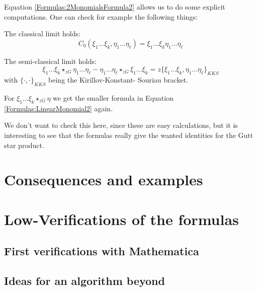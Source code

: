 \begin{remark}
	Equation \eqref{Formulas:2MonomialsFormula2} allows us to do some 
	explicit computations. One can check for example the following 
	things:
	\begin{remarklist}
		\item
		The classical limit holds:
		\begin{equation*}
			C_0(\xi_1 \ldots \xi_k, \eta_1 \ldots \eta_{\ell})
			=
			\xi_1 \ldots \xi_k \eta_1 \ldots \eta_{\ell}
		\end{equation*}
		
		\item
		The semi-classical limit holds:
		\begin{equation*}
			\xi_1 \ldots \xi_k \star_{zG} \eta_1 \ldots \eta_{\ell}
			-
			\eta_1 \ldots \eta_{\ell} \star_{zG} \xi_1 \ldots \xi_k
			=
			z 
			\{ \xi_1 \ldots \xi_k, \eta_1 \ldots \eta_{\ell} \}_{KKS}
		\end{equation*}
		with $\{\cdot, \cdot\}_{KKS}$ being the Kirillov-Konstant-
		Souriau bracket.
		
		\item
		For $\xi_1 \ldots \xi_k \star_{zG} \eta$ we get the smaller 
		formula in Equation \eqref{Formulas:LinearMonomial2} again.
	\end{remarklist}
	We don't want to check this here, since these are easy calculations, 
	but it is interesting to see that the formulas really give 
	the wanted identities for the Gutt star product.
\end{remark}


\section{Consequences and examples}
\label{sec:chap4_Consequences}


\section{Low-Verifications of the formulas}
\label{sec:chap4_Mathematica}

\subsection{First verifications with Mathematica}

\subsection{Ideas for an algorithm beyond}
